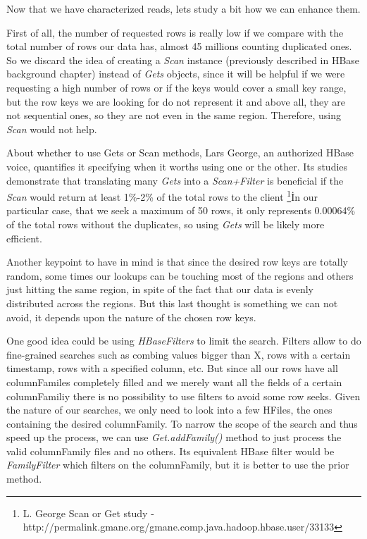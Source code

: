 Now that we have characterized reads, lets study a bit how we can enhance them. 
\par
First of all, the number of requested rows is really low if we compare with the total number of rows our data has, almost 45 millions counting duplicated ones. So we discard the idea of creating a \textit{Scan} instance (previously described in HBase background chapter) instead of \textit{Gets} objects, since it will be helpful if we were requesting a high number of rows or if the keys would cover a small key range, but the row keys we are looking for do not represent it and above all, they are not sequential ones, so they are not even in the same region. Therefore, using \textit{Scan} would not help. 
\par
About whether to use Gets or Scan methods, Lars George, an authorized HBase voice, quantifies it specifying when it worths using one or the other. Its studies demonstrate that translating many \textit{Gets} into a \textit{Scan+Filter} is beneficial if the \textit{Scan} would return at least 1\%-2\% of the total rows to the client \footnote{ L. George Scan or Get study - http://permalink.gmane.org/gmane.comp.java.hadoop.hbase.user/33133}\. In our particular case, that we seek a maximum of 50 rows, it only represents 0.00064\% of the total rows without the duplicates, so using \textit{Gets} will be likely more efficient.
\par
Another keypoint to have in mind is that since the desired row keys are totally random, some times our lookups can be touching most of the regions and others just hitting the same region, in spite of the fact that our data is evenly distributed across the regions. But this last thought is something we can not avoid, it depends upon the nature of the chosen row keys.
\par
One good idea could be using \textit{HBaseFilters} to limit the search. Filters allow to do fine-grained searches such as combing values bigger than X, rows with a certain timestamp, rows with a specified column, etc. But since all our rows have all columnFamiles completely filled and we merely want all the fields of a certain columnFamiliy there is no possibility to use filters to avoid some row seeks. Given the nature of our searches, we only need to look into a few HFiles, the ones containing the desired columnFamily. To narrow the scope of the search and thus speed up the process, we can use \textit{Get.addFamily()} method to just process the valid columnFamily files and no others. Its equivalent HBase filter would be \textit{FamilyFilter} which filters on the columnFamily, but it is better to use the prior method.
\par

